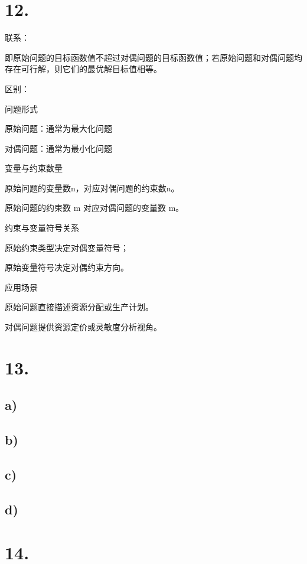 \documentclass{article}
\begin{document}
	\section*{12.}
	
	联系：
	
	即原始问题的目标函数值不超过对偶问题的目标函数值；若原始问题和对偶问题均存在可行解，则它们的最优解目标值相等。
	
	区别：
	
	问题形式
	
	原始问题：通常为最大化问题
	
	对偶问题：通常为最小化问题
	
	变量与约束数量
	
	原始问题的变量数n，对应对偶问题的约束数n。
	
	原始问题的约束数 
	m
	对应对偶问题的变量数 
	m。
	
	约束与变量符号关系
	
	原始约束类型决定对偶变量符号；
	
	原始变量符号决定对偶约束方向。	
	
	应用场景
	
	原始问题直接描述资源分配或生产计划。
	
	对偶问题提供资源定价或灵敏度分析视角。
	
	\section*{13.}
	
	\subsection*{a)}
	\Checkmark
	\subsection*{b)}
	\Checkmark
	\subsection*{c)}
	\Checkmark
	\subsection*{d)}
	\XSolid
	
	\section*{14.}
	
\end{document}
